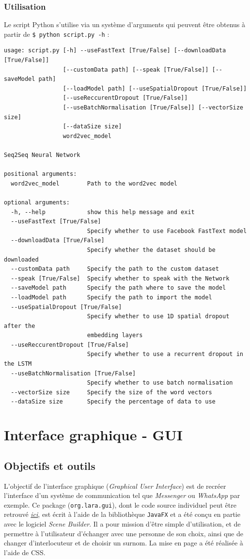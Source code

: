 \documentclass[10pt,a4paper]{article}
\begin{document}
\subsubsection{Utilisation}
Le script Python s'utilise via un système d'arguments qui peuvent être obtenus à partir de \texttt{\$ python script.py -h} :
\begin{verbatim}
usage: script.py [-h] --useFastText [True/False] [--downloadData [True/False]]
                 [--customData path] [--speak [True/False]] [--saveModel path]
                 [--loadModel path] [--useSpatialDropout [True/False]]
                 [--useReccurentDropout [True/False]]
                 [--useBatchNormalisation [True/False]] [--vectorSize size]
                 [--dataSize size]
                 word2vec_model

Seq2Seq Neural Network

positional arguments:
  word2vec_model        Path to the word2vec model

optional arguments:
  -h, --help            show this help message and exit
  --useFastText [True/False]
                        Specify whether to use Facebook FastText model
  --downloadData [True/False]
                        Specify whether the dataset should be downloaded
  --customData path     Specify the path to the custom dataset
  --speak [True/False]  Specify whether to speak with the Network
  --saveModel path      Specify the path where to save the model
  --loadModel path      Specify the path to import the model
  --useSpatialDropout [True/False]
                        Specify whether to use 1D spatial dropout after the
                        embedding layers
  --useReccurentDropout [True/False]
                        Specify whether to use a recurrent dropout in the LSTM
  --useBatchNormalisation [True/False]
                        Specify whether to use batch normalisation
  --vectorSize size     Specify the size of the word vectors
  --dataSize size       Specify the percentage of data to use
\end{verbatim}

\section{Interface graphique - GUI}
\subsection{Objectifs et outils}

L'objectif de l'interface graphique (\textit{Graphical User Interface}) est de recréer l'interface d'un système de communication tel que \textit{Messenger} ou \textit{WhatsApp} par exemple. Ce package (\texttt{org.lara.gui}), dont le code source individuel peut être retrouvé \href{https://github.com/LaraProject/GUI}{\textit{ici}}, est écrit à l'aide de la bibliothèque \texttt{JavaFX} et a été conçu en partie avec le logiciel \textit{Scene Builder}. Il a pour mission d'être simple d'utilisation, et de permettre à l'utilisateur d'échanger avec une personne de son choix, ainsi que de changer d'interlocuteur et de choisir un surnom. La mise en page a été réalisée à l'aide de CSS.
\end{document}
